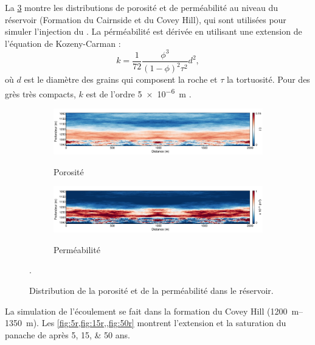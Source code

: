 La \cref{fig:res} montre les distributions de porosité et de perméabilité au
niveau du réservoir (Formation du Cairnside et du Covey Hill), qui sont utilisées
pour simuler l'injection du . La pérméabilité est dérivée en utilisant
une extension de l'équation de Kozeny-Carman \citep{Kozeny1927,Carman1938}:
\begin{equation}
k = \dfrac{1}{72}\dfrac{\phi^3}{(1-\phi)^2\tau^2}d^2,
\end{equation}
où $d$ est le diamètre des grains qui composent la roche et $\tau$ la tortuosité. Pour des grès très
compacts, $k$ est de l'ordre \SI{5e-6}{\metre}
\citep{DonaldRWiesnet1961}.
\begin{figure}[!ht]
        \centering
        \begin{subfigure}[b]{1\textwidth}
                \caption{Porosité}
                \includegraphics[width=\textwidth]{fig/phi_res.pdf}
                \label{fig:phi_res}
        \end{subfigure}%

        \begin{subfigure}[b]{1\textwidth}
                \caption{Perméabilité}
                \includegraphics[width=\textwidth]{fig/K_res.pdf}
                \label{fig:K_res}
        \end{subfigure}

        \caption{Distribution de la porosité et de la perméabilité dans le
réservoir.}
        \label{fig:res}.
\end{figure}
La simulation de l'écoulement se fait dans la formation du Covey Hill
(\SIrange{1200}{1350}{\metre}). Les \cref{fig:5r,fig:15r,,fig:50r} montrent
l'extension et la saturation du panache de  après \numlist{5;15;50}
ans.\par


